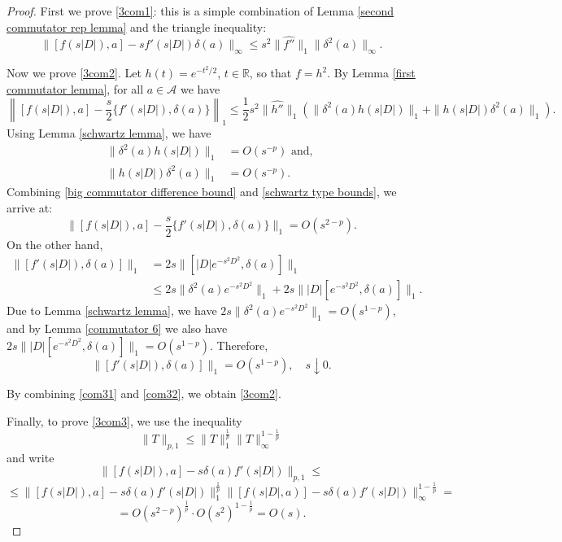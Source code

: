     \begin{proof} 
        First we prove \eqref{3com1}: this is a simple combination of Lemma \ref{second commutator rep lemma} and the triangle inequality:
        \begin{equation*}
            \|[f(s|D|),a]-sf'(s|D|)\delta(a)\|_\infty \leq s^2\|\widehat{f''}\|_1\|\delta^2(a)\|_\infty.
        \end{equation*}
        
        Now we prove \eqref{3com2}. Let $h(t) = e^{-t^2/2}$, $t \in \mathbb{R}$, so that $f = h^2$. By Lemma \ref{first commutator lemma}, for all $a \in \mathcal{A}$ we have
        \begin{equation}\label{big commutator difference bound}
            \left\|[f(s|D|),a]-\frac{s}{2}\{f'(s|D|),\delta(a)\}\right\|_1 \leq \frac{1}{2}s^2\|\hat{h''}\|_1(\|\delta^2(a)h(s|D|)\|_1+\|h(s|D|)\delta^2(a)\|_1).
        \end{equation} 
        Using Lemma \ref{schwartz lemma}, we have
        \begin{align}\label{schwartz type bounds}
            \|\delta^2(a)h(s|D|)\|_1 &= O(s^{-p})\text{ and, }\nonumber\\
            \|h(s|D|)\delta^2(a)\|_1 &= O(s^{-p}).
        \end{align}
        Combining \eqref{big commutator difference bound} and \eqref{schwartz type bounds}, we arrive at:
        \begin{equation}\label{com31}
            \|[f(s|D|),a]-\frac{s}{2}\{f'(s|D|),\delta(a)\}\|_1 = O(s^{2-p}).
        \end{equation}
        On the other hand,
        \begin{align*}
            \|[f'(s|D|),\delta(a)]\|_1 &= 2s\|[|D|e^{-s^2D^2},\delta(a)]\|_1\\
                                       &\leq 2s\|\delta^2(a)e^{-s^2D^2}\|_1+2s\||D|[e^{-s^2D^2},\delta(a)]\|_1.
        \end{align*}
        Due to Lemma \ref{schwartz lemma}, we have $2s\|\delta^2(a)e^{-s^2D^2}\|_1 = O(s^{1-p})$, and by Lemma \ref{commutator 6}
        we also have $2s\||D|[e^{-s^2D^2},\delta(a)]\|_1 = O(s^{1-p})$. Therefore,
        \begin{equation}\label{com32}
            \|[f'(s|D|),\delta(a)]\|_1 = O(s^{1-p}),\quad s \downarrow 0.
        \end{equation}
        
        By combining \eqref{com31} and \eqref{com32}, we obtain \eqref{3com2}.
        
        Finally, to prove \eqref{3com3}, we use the inequality
        $$\|T\|_{p,1}\leq\|T\|_1^{\frac1p}\|T\|_{\infty}^{1-\frac1p}$$
        and write
        $$\|[f(s|D|),a]-s\delta(a)f'(s|D|)\|_{p,1} \leq$$
        $$\leq\|[f(s|D|),a]-s\delta(a)f'(s|D|)\|_1^{\frac1p}\|[f(s|D|,a)]-s\delta(a)f'(s|D|)\|_{\infty}^{1-\frac1p}=$$
        $$= O(s^{2-p})^{\frac1p}\cdot O(s^{2})^{1-\frac1p}=O(s).$$
        \end{proof} 

